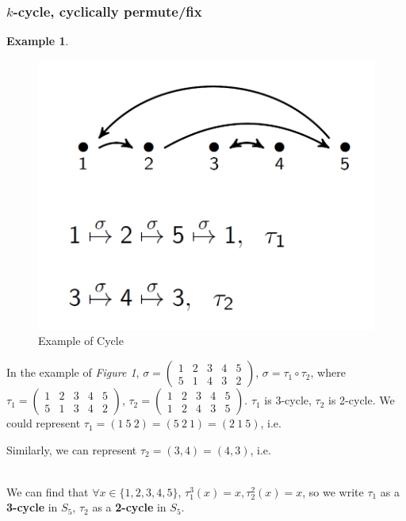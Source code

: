 \documentclass[11pt,a4paper]{article}
\newtheorem{example}{Example}
\begin{document}
\subsubsection{$k$-cycle, cyclically permute/fix}
\begin{example}
\end{example}
\begin{center}
\begin{figure}[htbp]
    \centering
    \includegraphics[scale=0.5]{Cycle.png}
    \caption{Example of Cycle}
\end{figure}
\end{center}
In the example of \textit{Figure 1}, $\sigma=\begin{pmatrix}
    1&2&3&4&5\\
    5&1&4&3&2
\end{pmatrix}$, $\sigma=\tau_1\circ\tau_2$, where $\tau_1=\begin{pmatrix}
    1&2&3&4&5\\
    5&1&3&4&2
\end{pmatrix}$, $\tau_2=\begin{pmatrix}
    1&2&3&4&5\\
    1&2&4&3&5
\end{pmatrix}$. $\tau_1$ is 3-cycle, $\tau_2$ is 2-cycle.
We could represent $\tau_1=(1\ 5\ 2)=(5\ 2\ 1)=(2\ 1\ 5)$, i.e.
Similarly, we can represent $\tau_2=(3,4)=(4,3)$, i.e.
\\
We can find that $\forall x\in \{1,2,3,4,5\}$, $\tau_1^{3}(x)=x, \tau_2^{2}(x)=x$, so we write $\tau_1$ as a \textbf{3-cycle} in $S_5$, $\tau_2$ as a \textbf{2-cycle} in $S_5$.\\
\end{document}
